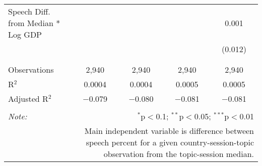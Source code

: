 \begin{table}[!htbp]
\begin{tabular}{@{\extracolsep{5pt}}lcccc}
 Speech Diff. from Median * Log GDP &  &  &  & 0.001 \\ 
  &  &  &  & (0.012) \\ 
  & & & & \\ 
\hline \\[-1.8ex] 
Observations & 2,940 & 2,940 & 2,940 & 2,940 \\ 
R$^{2}$ & 0.0004 & 0.0004 & 0.0005 & 0.0005 \\ 
Adjusted R$^{2}$ & $-$0.079 & $-$0.080 & $-$0.081 & $-$0.081 \\ 
\hline 
\hline \\[-1.8ex] 
\textit{Note:}  & \multicolumn{4}{r}{$^{*}$p$<$0.1; $^{**}$p$<$0.05; $^{***}$p$<$0.01} \\ 
 & \multicolumn{4}{r}{Main independent variable is difference between speech percent for a given country-session-topic observation from the topic-session median.} \\ 
\end{tabular} 
\end{table} 
